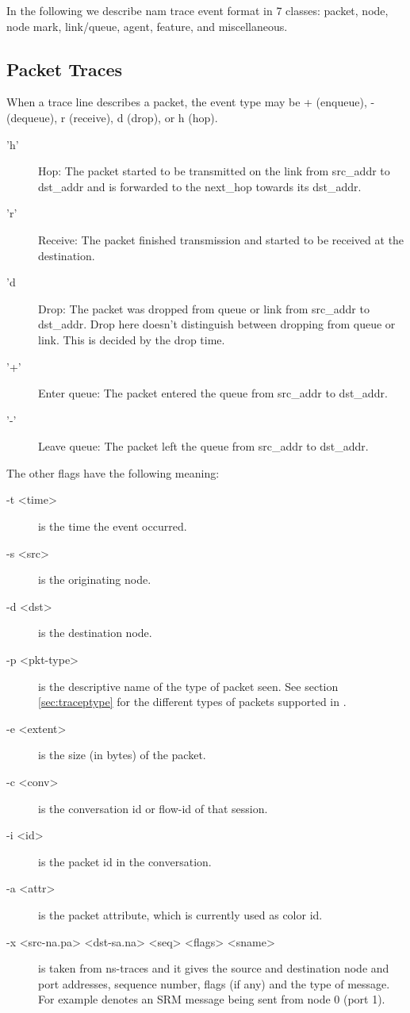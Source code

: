 In the following we describe nam trace event format in 7 classes:
packet, node, node mark, link/queue, agent, feature, and
miscellaneous.

\subsection{Packet Traces}

When a trace line describes a packet, 
the event type may be + (enqueue), - (dequeue), r (receive), d (drop), 
or h (hop). 
\begin{description}
\item['h'] Hop: The packet started to be transmitted on the link from
src\_addr to dst\_addr and is forwarded to the next\_hop towards its
dst\_addr.

\item['r'] Receive: The packet finished transmission and started to be
received at the destination.

\item['d] Drop: The packet was dropped from queue or link from src\_addr
to dst\_addr. Drop here doesn't distinguish between dropping from queue or
link. This is decided by the drop time.  

\item['+'] Enter queue: The packet entered the queue from src\_addr to
dst\_addr.

\item['-'] Leave queue: The packet left the queue from src\_addr to
dst\_addr.  
\end{description}

The other flags have the following meaning:
\begin{description}
\item[-t <time>] is the time the event occurred.
\item[-s <src>] is the originating node.
\item[-d <dst>] is the destination node.
\item[-p <pkt-type>] is the descriptive name of the type of packet seen.
See section \ref{sec:traceptype} for the different types of packets 
supported in \ns.
\item[-e <extent>] is the size (in bytes) of the packet.
\item[-c <conv>] is the conversation id or flow-id of that session.
\item[-i <id>] is the packet id in the conversation.
\item[-a <attr>] is the packet attribute, which is currently used as color
id. 
\item[-x <src-na.pa> <dst-sa.na> <seq> <flags> <sname>] is taken from
ns-traces and it gives the source and destination node and port
addresses, sequence number, flags (if any) and the type of message.
For example  denotes an
SRM message being sent from node 0 (port 1).
\end{description}


